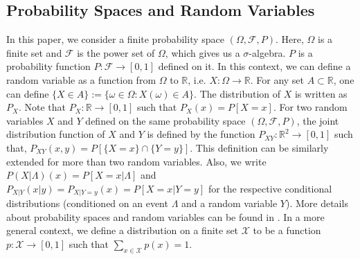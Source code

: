\documentclass{article}
\begin{document}
\subsection{Probability Spaces and Random Variables}\label{prob}
In this paper, we consider a finite probability space $(\Omega,\mathcal{F},P)$. Here, $\Omega$ is a finite set and $\mathcal{F}$ is the power set of $\Omega$, which gives us a $\sigma$-algebra. $P$ is a probability function $P: \mathcal{F} \to [0,1]$  defined on it. In this context, we can define a random variable as a function from $\Omega$ to $\mathbb{R}$, i.e. $X:\Omega \to \mathbb{R}$. For any set $A \subset \mathbb{R}$, one can define $\{X \in A\}:=\{\omega \in \Omega: X(\omega) \in A\}$. The distribution of $X$ is written as $P_X$. Note that $P_X: \mathbb{R} \to [0,1]$ such that $P_X(x)=P[X=x]$. For two random variables $X$ and $Y$ defined on the same probability space $(\Omega,\mathcal{F},P)$, the joint distribution function of $X$ and $Y$ is defined by the function $P_{XY}:\mathbb{R}^2 \to [0,1]$ such that, $P_{XY}(x,y)=P[\{X=x\} \cap \{Y=y\}]$. This definition can be similarly extended for more than two random variables. Also, we write $P(X|\Lambda)(x) = P[X =x | \Lambda]$ and $P_{X|Y} (x|y) = P_{X|Y=y} (x) = P[X =x | Y = y]$ for the respective conditional distributions (conditioned on an event $\Lambda$ and a random variable $Y$). More details about probability spaces and random variables can be found in \cite{gut2013probability}.
In a more general context, we define a distribution on a finite set $\mathcal{X}$ to be a function $p:\mathcal{X} \to [0,1]$ such that $\sum_{x \in \mathcal{X}}p(x)=1.$ 
\end{document}
